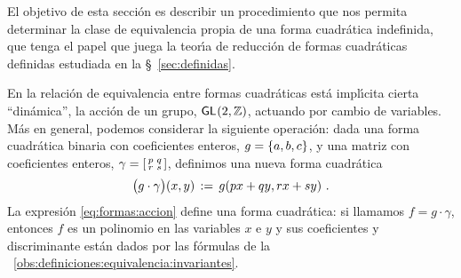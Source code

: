 \theoremstyle{plain}
\newtheorem{teoIndefinidas}{\teoname}[section]
\newtheorem{lemaIndefinidas}[teoIndefinidas]{\lemaname}
\newtheorem{coroIndefinidas}[teoIndefinidas]{\coroname}

\theoremstyle{definition}
\newtheorem{defIndefinidas}[teoIndefinidas]{}
\newtheorem{obsIndefinidas}[teoIndefinidas]{\obsname}
\newtheorem{ejemIndefinidas}[teoIndefinidas]{\ejemname}


El objetivo de esta secci\'on es describir un procedimiento que nos permita
determinar la clase de equivalencia propia de una forma cuadr\'atica
indefinida, que tenga el papel que juega la teor\'{\i}a de reducci\'on
de formas cuadr\'aticas definidas estudiada en la \S~\ref{sec:definidas}.

En la relaci\'on de equivalencia entre formas cuadr\'aticas est\'a
impl\'{\i}cita cierta ``din\'amica'', la acci\'on de un grupo,
$\mathsf{GL}_{}(2,\mathbb{Z})$, actuando por cambio de variables.
M\'as en general, podemos considerar la siguiente operaci\'on:
dada una forma cuadr\'atica binaria con coeficientes enteros,
$g=\left\{a,b,c\right\}$, y una matriz con coeficientes enteros,
$\gamma= \left[\begin{smallmatrix}  p & q \\ r & s  \end{smallmatrix}\right]$, definimos una nueva
forma cuadr\'atica
\begin{equation}
	\label{eq:formas:accion}
	\big(g\cdot\gamma\big)(x,y)\,:=\,g(px+qy,rx+sy)
	\text{ .}
\end{equation}
%
La expresi\'on \eqref{eq:formas:accion} define una forma cuadr\'atica:
si llamamos $f=g\cdot\gamma$, entonces $f$ es un polinomio en las variables
$x$ e $y$ y sus coeficientes y discriminante est\'an dados por las
f\'ormulas de la \obsname~\ref{obs:definiciones:equivalencia:invariantes}.
%

